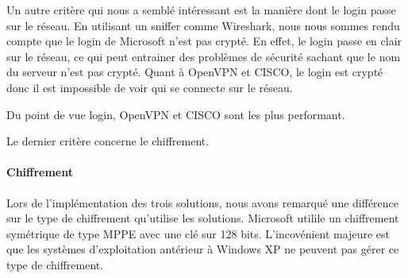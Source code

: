 Un autre critère qui nous a semblé intéressant est la manière dont le login passe sur le réseau. En utilisant un sniffer comme Wireshark, nous nous sommes rendu compte que le login de Microsoft n'est pas crypté. En effet, le login passe en clair sur le réseau, ce qui peut entrainer des problèmes de sécurité sachant que le nom du serveur n'est pas crypté. Quant à OpenVPN et CISCO, le login est crypté donc il est impossible de voir qui se connecte sur le réseau. 

Du point de vue login, OpenVPN et CISCO sont les plus performant.

Le dernier critère concerne le chiffrement.

\paragraph{Chiffrement}

Lors de l'implémentation des trois solutions, nous avons remarqué une différence sur le type de chiffrement qu'utilise les solutions.
Microsoft utilile un chiffrement symétrique de type MPPE avec une clé sur 128 bits. L'incovénient majeure est que les systèmes d'exploitation antérieur à Windows XP ne peuvent pas gérer ce type de chiffrement.